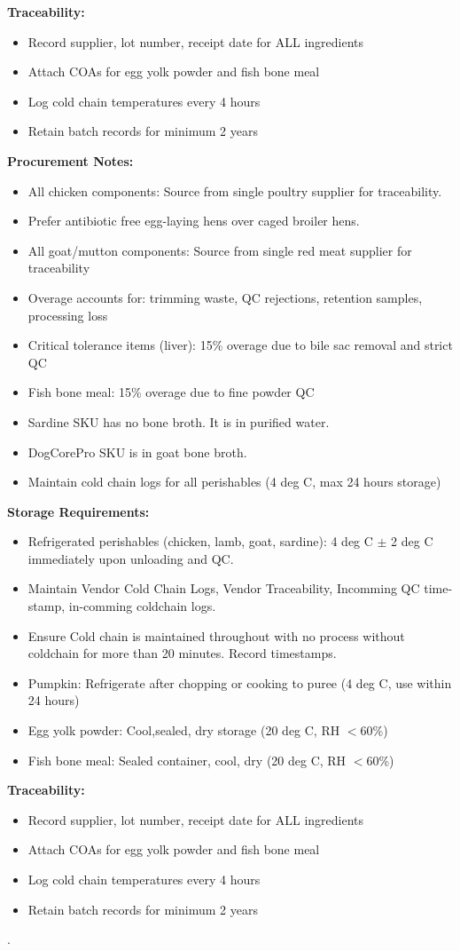 \textbf{Traceability:}
\begin{itemize}
\item Record supplier, lot number, receipt date for ALL ingredients
\item Attach COAs for egg yolk powder and fish bone meal
\item Log cold chain temperatures every 4 hours
\item Retain batch records for minimum 2 years
\end{itemize}

\vspace{1em}

\textbf{Procurement Notes:}
\begin{itemize}
\item All chicken components: Source from single poultry supplier for traceability. 
\item Prefer antibiotic free egg-laying hens over caged broiler hens. 
\item All goat/mutton components: Source from single red meat supplier for traceability
\item Overage accounts for: trimming waste, QC rejections, retention samples, processing loss
\item Critical tolerance items (liver): 15\% overage due to bile sac removal and strict QC
\item Fish bone meal: 15\% overage due to fine powder QC
\item Sardine SKU has no bone broth. It is in purified water. 
\item DogCorePro SKU is in goat bone broth. 
\item Maintain cold chain logs for all perishables (4 deg C, max 24 hours storage)
\end{itemize}

\textbf{Storage Requirements:}
\begin{itemize}
\item Refrigerated perishables (chicken, lamb, goat, sardine): 4 deg C $\pm$ 2 deg C immediately upon unloading and QC. 
\item Maintain Vendor Cold Chain Logs, Vendor Traceability, Incomming QC time-stamp, in-comming coldchain logs.
\item Ensure Cold chain is maintained throughout with no process without coldchain for more than 20 minutes. Record timestamps. 
\item Pumpkin: Refrigerate after chopping or cooking to puree (4 deg C, use within 24 hours)
\item Egg yolk powder: Cool,sealed, dry storage (20 deg C, RH $<$60\%)
\item Fish bone meal: Sealed container, cool, dry (20 deg C, RH $<$60\%)

\end{itemize}

\textbf{Traceability:}
\begin{itemize}
\item Record supplier, lot number, receipt date for ALL ingredients
\item Attach COAs for egg yolk powder and fish bone meal
\item Log cold chain temperatures every 4 hours
\item Retain batch records for minimum 2 years
\end{itemize}.